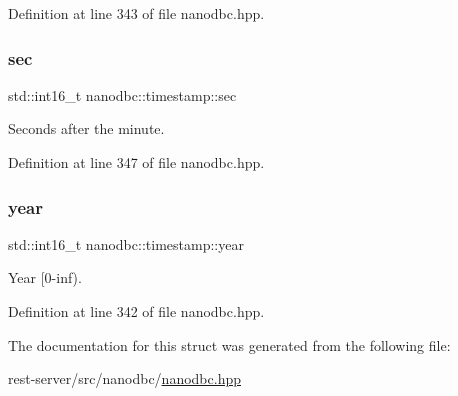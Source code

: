 Definition at line 343 of file nanodbc.\+hpp.

\mbox{\label{structnanodbc_1_1timestamp_a2656a11498c4efff9488cca0184a0c12}} 
\subsubsection{\texorpdfstring{sec}{sec}}
{\footnotesize\ttfamily std\+::int16\+\_\+t nanodbc\+::timestamp\+::sec}



Seconds after the minute. 



Definition at line 347 of file nanodbc.\+hpp.

\mbox{\label{structnanodbc_1_1timestamp_a6d1ef94ca614b995aea22d1b82da1270}} 
\subsubsection{\texorpdfstring{year}{year}}
{\footnotesize\ttfamily std\+::int16\+\_\+t nanodbc\+::timestamp\+::year}



Year \mbox{[}0-\/inf). 



Definition at line 342 of file nanodbc.\+hpp.



The documentation for this struct was generated from the following file\+:\begin{DoxyCompactItemize}
\item 
rest-\/server/src/nanodbc/\mbox{\hyperlink{nanodbc_8hpp}{nanodbc.\+hpp}}\end{DoxyCompactItemize}

